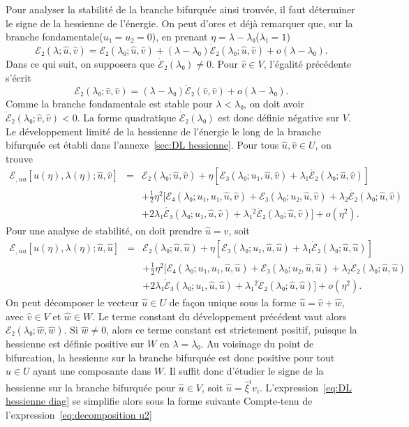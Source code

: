\documentclass[12pt, final]{amsart}
\theoremstyle{definition}
\begin{document}
Pour analyser la stabilité de la branche bifurquée ainsi trouvée, il faut déterminer le signe de la hessienne de l'énergie. On peut d'ores et déjà remarquer que, sur la branche fondamentale(\(u₁ = u₂ = 0\)), en prenant \(η = λ - λ₀\)(\(λ₁ = 1\))
\begin{equation}
  ℰ₂(λ ; \hat{u}, \hat{v}) =ℰ₂(λ₀ ;
  \hat{u}, \hat{v}) +(λ - λ₀)  \dot{ℰ}₂(λ₀ ;
  \hat{u}, \hat{v}) + o(λ - λ₀) .
\end{equation}
Dans ce qui suit, on supposera que \(\dot{ℰ}₂(λ₀) \neq 0\). Pour \(\hat{v}∈V\), l'égalité précédente s'écrit
\begin{equation}
  ℰ₂(λ₀ ; \hat{v}, \hat{v}) =(λ - λ₀)
  \dot{ℰ}₂(\hat{v}, \hat{v}) + o(λ - λ₀) .
\end{equation}
Comme la branche fondamentale est stable pour \(λ < λ₀\), on doit avoir \(\dot{ℰ}₂(λ₀ ; \hat{v}, \hat{v}) < 0\). La forme quadratique \(\dot{ℰ}₂(λ₀)\) est donc définie négative sur \(V\). Le développement limité de la hessienne de l'énergie le long de la branche bifurquée est établi dans l'annexe~\ref{sec:DL hessienne}. Pour tous \(\hat{u}, \hat{v}∈U\), on trouve
\begin{eqnarray}
  ℰ_{, u  u} [u(η), λ(η) ; \hat{u}, \hat{v}] &
  = & ℰ₂(λ₀ ; \hat{u}, \hat{v}) + η [ℰ₃
 (λ₀ ; u₁, \hat{u}, \hat{v})   + λ₁
  \dot{ℰ₂}(λ₀ ; \hat{u}, \hat{v})] \nonumber\\
  &  &  + \tfrac{1}{2} η^2  [ℰ₄(λ₀ ; u₁, u₁,
  \hat{u}, \hat{v})  +ℰ₃(λ₀ ; u₂, \hat{u},
  \hat{v}) + λ₂  \dot{ℰ₂}(λ₀ ; \hat{u}, \hat{v})
  \nonumber\\
  &  &  + 2 λ₁  \dot{ℰ₃}(λ₀ ; u₁,
  \hat{u}, \hat{v}) + λ₁^2  \ddot{ℰ₂}(λ₀ ; \hat{u},
  \hat{v}) ] + o(η^2) .  \label{eq:DL hessienne}
\end{eqnarray}
Pour une analyse de stabilité, on doit prendre \(\hat{u} = \hat{v}\), soit
\begin{eqnarray}
  ℰ_{, u  u} [u(η), λ(η) ; \hat{u}, \hat{u}] &
  = & ℰ₂(λ₀ ; \hat{u}, \hat{u}) + η [ℰ₃
 (λ₀ ; u₁, \hat{u}, \hat{u}) + λ₁  \dot{ℰ}₂
 (λ₀ ; \hat{u}, \hat{u})] \nonumber\\
  &  & + \tfrac{1}{2} η^2  [ℰ₄(λ₀ ; u₁, u₁, \hat{u},
  \hat{u}) +ℰ₃(λ₀ ; u₂, \hat{u}, \hat{u}) + λ₂
  \dot{ℰ}₂(λ₀ ; \hat{u}, \hat{u})  \nonumber\\
  &  & +  2 λ₁  \dot{ℰ}₃(λ₀ ; u₁,
  \hat{u}, \hat{u}) + λ₁^2  \ddot{ℰ}₂(λ₀ ; \hat{u},
  \hat{u})] + o(η^2) .  \label{eq:DL hessienne diag}
\end{eqnarray}
On peut décomposer le vecteur \(\hat{u}∈U\) de fa{\c c}on unique sous la forme \(\hat{u} = \hat{v} + \hat{w}\), avec \(\hat{v}∈V\) et \(\hat{w}∈W\). Le terme constant du développement précédent vaut alors \(ℰ₂(λ₀ ; \hat{w}, \hat{w})\). Si \(\hat{w} \neq 0\), alors ce terme constant est strictement positif, puisque la hessienne est définie positive sur \(W\) en \(λ = λ₀\). Au voisinage du point de bifurcation, la hessienne sur la branche bifurquée est donc positive pour tout \(\hat{u}∈U\) ayant une composante dans \(W\). Il suffit donc d'étudier le signe de la hessienne sur la branche bifurquée pour \(\hat{u}∈V\), soit \(\hat{u} = \hat{ξ}^i v_i\). L'expression~\eqref{eq:DL hessienne diag} se simplifie alors sous la forme suivante  Compte-tenu de l'expression~\eqref{eq:decomposition u2}
\end{document}

